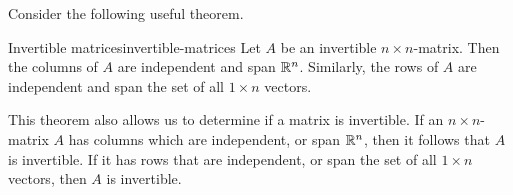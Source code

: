 Consider the following useful theorem.

\begin{theorem}{Invertible matrices}{invertible-matrices}
Let $A$ be an invertible $n \times n$-matrix. Then the columns of $A$ are independent and span $\mathbb{R}^n$. Similarly, the rows of $A$ are independent and span the set of all $1 \times n$ vectors. 
\end{theorem}

This theorem also allows us to determine if a matrix is invertible. If an $n \times n$-matrix $A$ has columns which are independent, or span $\mathbb{R}^n$, then it follows that $A$ is invertible. If it has rows that are independent, or span the set of all $1 \times n$ vectors, then $A$ is invertible.
